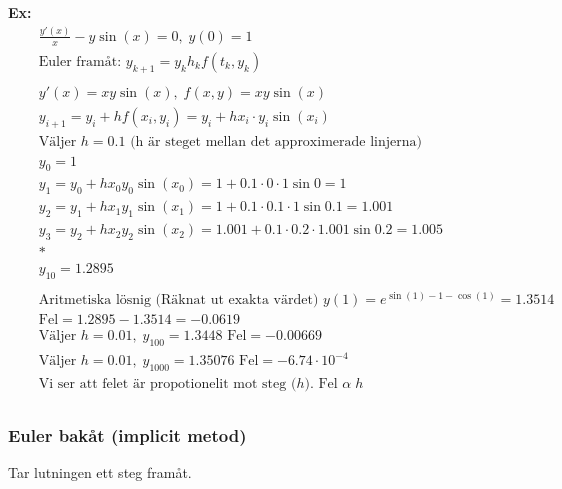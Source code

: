 \documentclass{article}
\begin{document}
\textbf{Ex:}
\begin{align*}
  &\quad  \frac{y'(x)}{x} - y\sin{(x)} = 0, \; y(0)=1 \\
  &\quad  \text{Euler framåt: } y_{k+1} = y_k h_kf(t_k,y_k) \\
  &\quad  \\
  &\quad  y'(x) = xy\sin{(x)}, \; f(x,y) = xy\sin{(x)} \\
  &\quad  y_{i+1} = y_i + hf(x_i,y_i) = y_i+hx_i\cdot{y_i\sin{(x_i)}} \\
  &\quad  \text{Väljer $h=0.1$ (h är steget mellan det approximerade linjerna)} \\
  &\quad  y_0 = 1 \\
  &\quad  y_1 = y_0+hx_0y_0\sin{(x_0)} = 1+0.1\cdot0\cdot1\sin{0} = 1 \\
  &\quad  y_2 = y_1+hx_1y_1\sin{(x_1)} = 1+0.1\cdot0.1\cdot1\sin{0.1} = 1.001 \\
  &\quad  y_3 = y_2+hx_2y_2\sin{(x_2)} = 1.001+0.1\cdot0.2\cdot1.001\sin{0.2} = 1.005 \\
  &\quad  * \\
  &\quad  y_{10} = 1.2895 \\
  &\quad  \\
  &\quad  \text{Aritmetiska lösnig (Räknat ut exakta värdet) }
  y(1)=e^{\sin{(1)-1-\cos{(1)}}} = 1.3514 \\
  &\quad  \text{Fel} = 1.2895-1.3514 = -0.0619 \\
  &\quad  \text{Väljer } h=0.01, \; y_{100} = 1.3448 \text{ Fel} = -0.00669 \\
  &\quad  \text{Väljer } h=0.01, \; y_{1000} = 1.35076 \text{ Fel} = -6.74\cdot10^{-4} \\
  &\quad  \text{Vi ser att felet är propotionelit mot steg ($h$). Fel } \alpha \; h \\
\end{align*}

\newpage
\subsubsection{Euler bakåt (implicit metod)}
Tar lutningen ett steg framåt.
\end{document}
